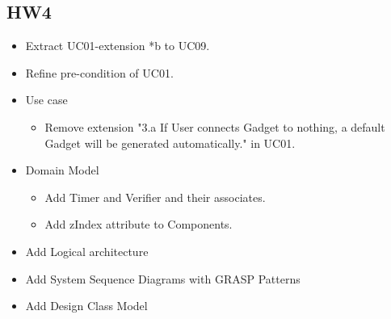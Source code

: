 \documentclass[12pt]{article}
\begin{document}
    \subsection{HW4}
    \begin{itemize}
        \item Extract UC01-extension *b to UC09.
        \item Refine pre-condition of UC01.
        \item Use case
        \begin{itemize}
            \item Remove extension "3.a If User connects Gadget to nothing, a default Gadget will be generated automatically." in UC01.
        \end{itemize}
        \item Domain Model
        \begin{itemize}
            \item Add Timer and Verifier and their associates.
            \item Add zIndex attribute to Components.
        \end{itemize}
        \item Add Logical architecture
        \item Add System Sequence Diagrams with GRASP Patterns
        \item Add Design Class Model
    \end{itemize}
\end{document}
